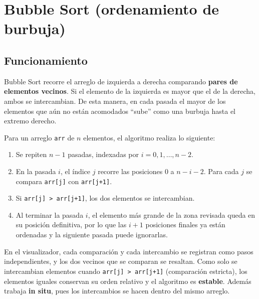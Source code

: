 
\section{Bubble Sort (ordenamiento de burbuja)}

\subsection{Funcionamiento}

Bubble Sort recorre el arreglo de izquierda a derecha comparando \textbf{pares de elementos vecinos}. Si el elemento de la izquierda es mayor que el de la derecha, ambos se intercambian. De esta manera, en cada pasada el mayor de los elementos que aún no están acomodados ``sube'' como una burbuja hasta el extremo derecho.

Para un arreglo \texttt{arr} de $n$ elementos, el algoritmo realiza lo siguiente:

\begin{enumerate}
  \item Se repiten $n-1$ pasadas, indexadas por $i = 0, 1, \dots, n-2$.
  \item En la pasada $i$, el índice $j$ recorre las posiciones $0$ a $n-i-2$. Para cada $j$ se compara \texttt{arr[j]} con \texttt{arr[j+1]}.
  \item Si \texttt{arr[j] > arr[j+1]}, los dos elementos se intercambian.
  \item Al terminar la pasada $i$, el elemento más grande de la zona revisada queda en su posición definitiva, por lo que las $i+1$ posiciones finales ya están ordenadas y la siguiente pasada puede ignorarlas.
\end{enumerate}

En el visualizador, cada comparación y cada intercambio se registran como pasos independientes, y los dos vecinos que se comparan se resaltan. Como solo se intercambian elementos cuando \texttt{arr[j] > arr[j+1]} (comparación estricta), los elementos iguales conservan su orden relativo y el algoritmo es \textbf{estable}. Además trabaja \textbf{in situ}, pues los intercambios se hacen dentro del mismo arreglo.

